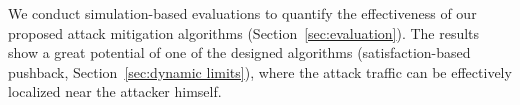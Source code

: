 We conduct simulation-based evaluations to quantify the effectiveness of our proposed attack mitigation algorithms (Section~\ref{sec:evaluation}).
The results show a great potential of one of the designed algorithms (satisfaction-based pushback, Section~\ref{sec:dynamic limits}), where the attack traffic can be effectively localized near the attacker himself.



